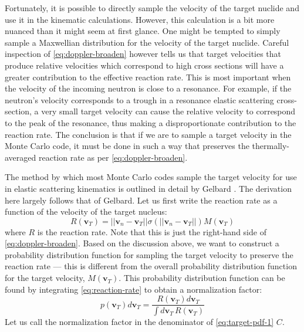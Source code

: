 Fortunately, it is possible to directly sample the velocity of the target
nuclide and use it in the kinematic calculations. However, this calculation is a
bit more nuanced than it might seem at first glance. One might be tempted to
simply sample a Maxwellian distribution for the velocity of the target nuclide.
Careful inspection of \eqref{eq:doppler-broaden} however tells us that target
velocities that produce relative velocities which correspond to high cross
sections will have a greater contribution to the effective reaction rate. This
is most important when the velocity of the incoming neutron is close to a
resonance. For example, if the neutron's velocity corresponds to a trough in a
resonance elastic scattering cross-section, a very small target velocity can
cause the relative velocity to correspond to the peak of the resonance, thus
making a disproportionate contribution to the reaction rate. The conclusion is
that if we are to sample a target velocity in the Monte Carlo code, it must be
done in such a way that preserves the thermally-averaged reaction rate as per
\eqref{eq:doppler-broaden}.

The method by which most Monte Carlo codes sample the target velocity for use in
elastic scattering kinematics is outlined in detail by Gelbard
\cite{anl-gelbard-1979}. The derivation here largely follows that of
Gelbard. Let us first write the reaction rate as a function of the velocity of
the target nucleus:
\begin{equation}
  \label{eq:reaction-rate}
  R(\mathbf{v}_T) = || \mathbf{v}_n - \mathbf{v}_T || \sigma ( ||
  \mathbf{v}_n - \mathbf{v}_T || ) M ( \mathbf{v}_T )
\end{equation}
where $R$ is the reaction rate. Note that this is just the right-hand side of
\eqref{eq:doppler-broaden}. Based on the discussion above, we want to construct
a probability distribution function for sampling the target velocity to preserve
the reaction rate --- this is different from the overall probability
distribution function for the target velocity, $M ( \mathbf{v}_T )$. This
probability distribution function can be found by integrating
\eqref{eq:reaction-rate} to obtain a normalization factor:
\begin{equation}
  \label{eq:target-pdf-1}
  p( \mathbf{v}_T ) d\mathbf{v}_T = \frac{R(\mathbf{v}_T) d\mathbf{v}_T}{\int
    d\mathbf{v}_T \, R(\mathbf{v}_T)}
\end{equation}
Let us call the normalization factor in the denominator of
\eqref{eq:target-pdf-1} $C$.

